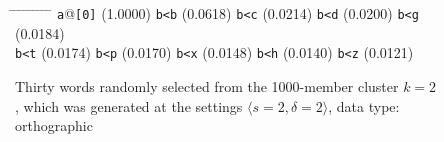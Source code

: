\begin{figure}[ht]
\begin{mdframed}
\begin{mdframed}
\begin{small}
\begin{tabbing}
\hspace{6ex} \= \hspace{9.5ex} \= \hspace{6ex} \= \hspace{9.5ex} \= \hspace{6ex} \= \hspace{9.5ex} \= \hspace{6ex} \= \hspace{9.5ex} \= \hspace{6ex} \= \hspace{9.5ex} \kill
\texttt{a}@\texttt{[0]} \> (1.0000) \> \texttt{b<b} \> (0.0618) \> \texttt{b<c} \> (0.0214) \> \texttt{b<d} \> (0.0200) \> \texttt{b<g} \> (0.0184) \\
 \texttt{b<t} \> (0.0174) \> \texttt{b<p} \> (0.0170) \> \texttt{b<x} \> (0.0148) \> \texttt{b<h} \> (0.0140) \> \texttt{b<z} \> (0.0121)
\end{tabbing}
\end{small}
\end{mdframed}
\vspace{-6pt}
\caption{Thirty words randomly selected from the 1000-member cluster $k = 2$, which was generated at the settings $\langle{s}=2,\delta=2\rangle$, data type: orthographic}
\label{fig:cluster-2-2-2-O}
\end{mdframed}
\end{figure}

